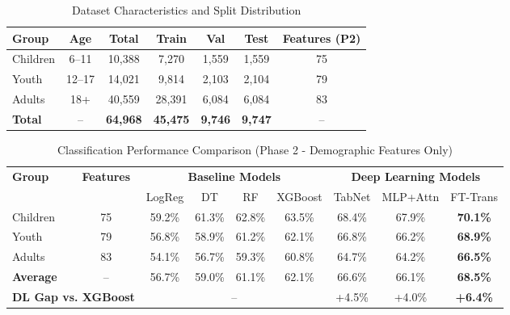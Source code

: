 \documentclass{article}
\begin{document}

\begin{table}[ht]
\centering
\caption{Dataset Characteristics and Split Distribution}
\label{tab:dataset}
\begin{tabular}{lcccccc}
\toprule
\textbf{Group} & \textbf{Age} & \textbf{Total} & \textbf{Train} & \textbf{Val} & \textbf{Test} & \textbf{Features (P2)} \\
\midrule
Children & 6--11  & 10,388 & 7,270  & 1,559 & 1,559 & 75 \\
Youth    & 12--17 & 14,021 & 9,814  & 2,103 & 2,104 & 79 \\
Adults   & 18+    & 40,559 & 28,391 & 6,084 & 6,084 & 83 \\
\midrule
\textbf{Total} & -- & \textbf{64,968} & \textbf{45,475} & \textbf{9,746} & \textbf{9,747} & -- \\
\bottomrule
\end{tabular}
\end{table}


\begin{table}[ht]
\centering
\caption{Classification Performance Comparison (Phase 2 - Demographic Features Only)}
\label{tab:results_phase2}
\begin{tabular}{lcccccccc}
\toprule
\multirow{2}{*}{\textbf{Group}} & \multirow{2}{*}{\textbf{Features}} & \multicolumn{4}{c}{\textbf{Baseline Models}} & \multicolumn{3}{c}{\textbf{Deep Learning Models}} \\
\cmidrule(lr){3-6} \cmidrule(lr){7-9}
& & LogReg & DT & RF & XGBoost & TabNet & MLP+Attn & FT-Trans \\
\midrule
Children & 75 & 59.2\% & 61.3\% & 62.8\% & 63.5\% & 68.4\% & 67.9\% & \textbf{70.1\%} \\
Youth    & 79 & 56.8\% & 58.9\% & 61.2\% & 62.1\% & 66.8\% & 66.2\% & \textbf{68.9\%} \\
Adults   & 83 & 54.1\% & 56.7\% & 59.3\% & 60.8\% & 64.7\% & 64.2\% & \textbf{66.5\%} \\
\midrule
\textbf{Average} & -- & 56.7\% & 59.0\% & 61.1\% & 62.1\% & 66.6\% & 66.1\% & \textbf{68.5\%} \\
\midrule
\multicolumn{2}{l}{\textbf{DL Gap vs. XGBoost}} & \multicolumn{4}{c}{--} & +4.5\% & +4.0\% & \textbf{+6.4\%} \\
\bottomrule
\end{tabular}
\end{table}
\end{document}
